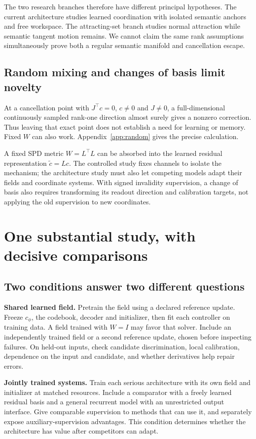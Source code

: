 \documentclass[11pt,a4paper]{article}
\newcommand{\newtopic}{\clearpage}
\begin{document}
The two research branches therefore have different principal hypotheses. The current architecture studies learned coordination with isolated semantic anchors and free workspace. The attracting-set branch studies normal attraction while semantic tangent motion remains. We cannot claim the same rank assumptions simultaneously prove both a regular semantic manifold and cancellation escape.

\subsection{Random mixing and changes of basis limit novelty}
At a cancellation point with $J^\top c=0$, $c\ne0$ and $J\ne0$, a full-dimensional continuously sampled rank-one direction almost surely gives a nonzero correction. Thus leaving that exact point does not establish a need for learning or memory. Fixed $W$ can also work. Appendix~\ref{app:random} gives the precise calculation.

A fixed SPD metric $W=L^\top L$ can be absorbed into the learned residual representation $\widetilde c=Lc$. The controlled study fixes channels to isolate the mechanism; the architecture study must also let competing models adapt their fields and coordinate systems. With signed invalidity supervision, a change of basis also requires transforming its readout direction and calibration targets, not applying the old supervision to new coordinates.


\newtopic
\section{One substantial study, with decisive comparisons}\label{sec:study}
\subsection{Two conditions answer two different questions}
\textbf{Shared learned field.} Pretrain the field using a declared reference update. Freeze $c_\phi$, the codebook, decoder and initializer, then fit each controller on training data. A field trained with $W=I$ may favor that solver. Include an independently trained field or a second reference update, chosen before inspecting failures. On held-out inputs, check candidate discrimination, local calibration, dependence on the input and candidate, and whether derivatives help repair errors.

\textbf{Jointly trained systems.} Train each serious architecture with its own field and initializer at matched resources. Include a comparator with a freely learned residual basis and a general recurrent model with an unrestricted output interface. Give comparable supervision to methods that can use it, and separately expose auxiliary-supervision advantages. This condition determines whether the architecture has value after competitors can adapt.
\end{document}
